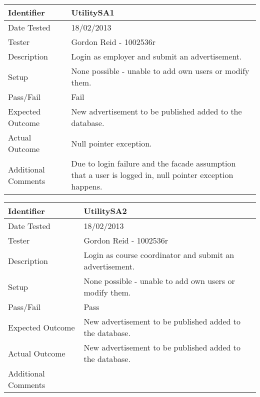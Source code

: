 \begin{tabularx}{\textwidth}{|T|L|}
\hline
Identifier & UtilitySA1\\
\hline
Date Tested & 18/02/2013\\
\hline
Tester & Gordon Reid - 1002536r\\
\hline
Description & Login as employer and submit an advertisement.\\
\hline
Setup & None possible - unable to add own users or modify them.\\
\hline
Pass/Fail & Fail\\
\hline
Expected Outcome & New advertisement to be published added to the database.\\
\hline
Actual Outcome & Null pointer exception.\\
\hline
Additional Comments & Due to login failure and the facade assumption that a user 
is logged in, null pointer exception happens.\\
\hline
\end{tabularx}

\vspace{2em}

\begin{tabularx}{\textwidth}{|T|L|}
\hline
Identifier & UtilitySA2\\
\hline
Date Tested & 18/02/2013\\
\hline
Tester & Gordon Reid - 1002536r\\
\hline
Description & Login as course coordinator and submit an advertisement.\\
\hline
Setup & None possible - unable to add own users or modify them.\\
\hline
Pass/Fail & Pass\\
\hline
Expected Outcome & New advertisement to be published added to the database.\\
\hline
Actual Outcome & New advertisement to be published added to the database.\\
\hline
Additional Comments &\\
\hline
\end{tabularx}

\vspace{2em}

